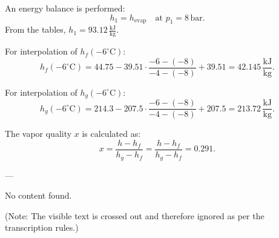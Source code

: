 An energy balance is performed:
\[
h_1 = h_{\text{evap}} \quad \text{at } p_1 = 8 \, \text{bar}.
\]
From the tables, \( h_1 = 93.12 \, \frac{\text{kJ}}{\text{kg}} \).

For interpolation of \( h_f(-6^\circ\text{C}) \):
\[
h_f(-6^\circ\text{C}) = 44.75 - 39.51 \cdot \frac{-6 - (-8)}{-4 - (-8)} + 39.51 = 42.145 \, \frac{\text{kJ}}{\text{kg}}.
\]

For interpolation of \( h_g(-6^\circ\text{C}) \):
\[
h_g(-6^\circ\text{C}) = 214.3 - 207.5 \cdot \frac{-6 - (-8)}{-4 - (-8)} + 207.5 = 213.72 \, \frac{\text{kJ}}{\text{kg}}.
\]

The vapor quality \( x \) is calculated as:
\[
x = \frac{h - h_f}{h_g - h_f} = \frac{h - h_f}{h_g - h_f} = 0.291.
\]

---

No content found.  

(Note: The visible text is crossed out and therefore ignored as per the transcription rules.)